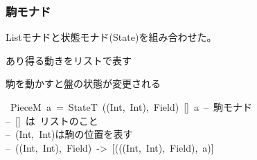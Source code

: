 \documentclass[xcolor=table]{beamer}
\begin{document}
\begin{mdframe}%

\frametitle{駒モナド}\label{heading-section}%

\noindent{}Listモナドと状態モナド(State)を組み合わせた。%

あり得る動きをリストで表す%

駒を動かすと盤の状態が変更される%
\begin{mdpre}%
~{PieceM}~{a}~{=}~{StateT}~{(}{(}{Int}{,}~{Int}{)}{,}~{Field}{)}~{[}{]}~{a}~{--~駒モナド}\\
{--~{}[]~は~リストのこと}\\
{--~(Int,~Int)は駒の位置を表す}\\
{--~((Int,~Int),~Field)~-\textgreater{}~{}[(((Int,~Int),~Field),~a)]}%
\end{mdpre}%
\end{mdframe}\label{section}%
\end{document}
